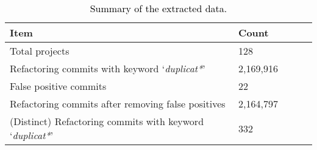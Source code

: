 \begin{table}[h!]
\begin{center}
\caption{\textcolor{black}{Summary of the extracted data.}}
\label{Table:DATA_Overview}
\begin{adjustbox}{width=1.0\textwidth,center}
\begin{tabular}{lllll}\hline
\toprule
\bfseries Item & \bfseries Count \\
\midrule
Total projects & 128 \\
\cellcolor{gray!30}Refactoring commits with keyword `\textit{duplicat*}' & \cellcolor{gray!30}2,169,916  \\
False positive commits & 22 \\
\cellcolor{gray!30}Refactoring commits after removing false positives & \cellcolor{gray!30}2,164,797 \\
(Distinct) Refactoring commits with keyword `\textit{duplicat*}' & 332  \\
\bottomrule
\end{tabular}
\end{adjustbox}
\end{center}
\end{table}